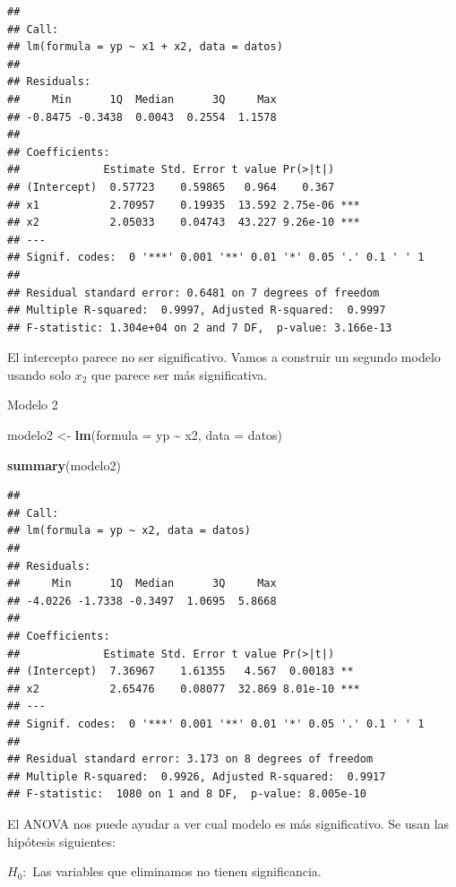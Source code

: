\documentclass[
]{book}
\newenvironment{Shaded}{\begin{snugshade}}{\end{snugshade}}
\newcommand{\AttributeTok}[1]{\textcolor[rgb]{0.13,0.29,0.53}{#1}}
\newcommand{\FunctionTok}[1]{\textcolor[rgb]{0.13,0.29,0.53}{\textbf{#1}}}
\newcommand{\NormalTok}[1]{#1}
\newcommand{\OtherTok}[1]{\textcolor[rgb]{0.56,0.35,0.01}{#1}}
\newcommand{\SpecialCharTok}[1]{\textcolor[rgb]{0.81,0.36,0.00}{\textbf{#1}}}
\begin{document}
\begin{verbatim}
## 
## Call:
## lm(formula = yp ~ x1 + x2, data = datos)
## 
## Residuals:
##     Min      1Q  Median      3Q     Max 
## -0.8475 -0.3438  0.0043  0.2554  1.1578 
## 
## Coefficients:
##             Estimate Std. Error t value Pr(>|t|)    
## (Intercept)  0.57723    0.59865   0.964    0.367    
## x1           2.70957    0.19935  13.592 2.75e-06 ***
## x2           2.05033    0.04743  43.227 9.26e-10 ***
## ---
## Signif. codes:  0 '***' 0.001 '**' 0.01 '*' 0.05 '.' 0.1 ' ' 1
## 
## Residual standard error: 0.6481 on 7 degrees of freedom
## Multiple R-squared:  0.9997, Adjusted R-squared:  0.9997 
## F-statistic: 1.304e+04 on 2 and 7 DF,  p-value: 3.166e-13
\end{verbatim}

El intercepto parece no ser significativo. Vamos a construir un segundo modelo usando solo \(x_2\) que parece ser más significativa.

Modelo 2

\begin{Shaded}
\begin{Highlighting}[]
\NormalTok{modelo2 }\OtherTok{\textless{}{-}} \FunctionTok{lm}\NormalTok{(}\AttributeTok{formula =}\NormalTok{ yp }\SpecialCharTok{\textasciitilde{}}\NormalTok{ x2, }\AttributeTok{data =}\NormalTok{ datos)}

\FunctionTok{summary}\NormalTok{(modelo2)}
\end{Highlighting}
\end{Shaded}

\begin{verbatim}
## 
## Call:
## lm(formula = yp ~ x2, data = datos)
## 
## Residuals:
##     Min      1Q  Median      3Q     Max 
## -4.0226 -1.7338 -0.3497  1.0695  5.8668 
## 
## Coefficients:
##             Estimate Std. Error t value Pr(>|t|)    
## (Intercept)  7.36967    1.61355   4.567  0.00183 ** 
## x2           2.65476    0.08077  32.869 8.01e-10 ***
## ---
## Signif. codes:  0 '***' 0.001 '**' 0.01 '*' 0.05 '.' 0.1 ' ' 1
## 
## Residual standard error: 3.173 on 8 degrees of freedom
## Multiple R-squared:  0.9926, Adjusted R-squared:  0.9917 
## F-statistic:  1080 on 1 and 8 DF,  p-value: 8.005e-10
\end{verbatim}

El ANOVA nos puede ayudar a ver cual modelo es más significativo. Se usan las hipótesis siguientes:

\(H_0:\) Las variables que eliminamos no tienen significancia.
\end{document}
